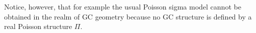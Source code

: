 \documentclass{article}
\newcommand{\TT}{{T\oplus T^*}}
\newcommand{\JJ}{\mathcal{J}}
\newcommand{\GG}{\mathcal{G}}
\newcommand{\id}{\mathbbm{1}}
\newcommand{\ap}{\alpha}
\newcommand{\bt}{\beta}
\newcommand{\rd}{\mathrm{d}}
\newcommand{\se}{\Gamma}
\newcommand{\la}{\langle}
\newcommand{\ra}{\rangle}
\newcommand{\lara}{\la\ ,\ \ra}
\theoremstyle{definition}
\theoremstyle{remark}
\DeclareMathOperator{\End}{End}
\begin{document}
Notice, however, that for example the usual Poisson sigma model cannot be obtained in the realm of GC geometry because no GC structure is defined by a real Poisson structure $\Pi$.

%
%
\end{document}
